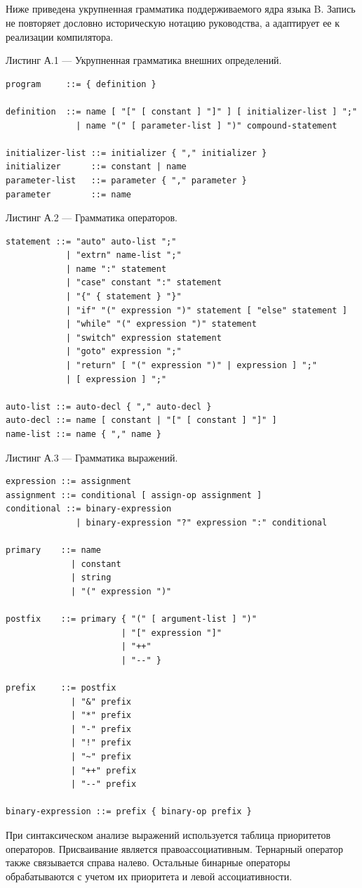 \begin{appendices}
\chapter{}

Ниже приведена укрупненная грамматика поддерживаемого ядра языка B. Запись не повторяет дословно историческую нотацию руководства, а адаптирует ее к реализации компилятора.

Листинг А.1 --- Укрупненная грамматика внешних определений.
\begin{verbatim}
program     ::= { definition }

definition  ::= name [ "[" [ constant ] "]" ] [ initializer-list ] ";"
              | name "(" [ parameter-list ] ")" compound-statement

initializer-list ::= initializer { "," initializer }
initializer      ::= constant | name
parameter-list   ::= parameter { "," parameter }
parameter        ::= name
\end{verbatim}

Листинг А.2 --- Грамматика операторов.
\begin{verbatim}
statement ::= "auto" auto-list ";"
            | "extrn" name-list ";"
            | name ":" statement
            | "case" constant ":" statement
            | "{" { statement } "}"
            | "if" "(" expression ")" statement [ "else" statement ]
            | "while" "(" expression ")" statement
            | "switch" expression statement
            | "goto" expression ";"
            | "return" [ "(" expression ")" | expression ] ";"
            | [ expression ] ";"

auto-list ::= auto-decl { "," auto-decl }
auto-decl ::= name [ constant | "[" [ constant ] "]" ]
name-list ::= name { "," name }
\end{verbatim}

Листинг А.3 --- Грамматика выражений.
\begin{verbatim}
expression ::= assignment
assignment ::= conditional [ assign-op assignment ]
conditional ::= binary-expression
              | binary-expression "?" expression ":" conditional

primary    ::= name
             | constant
             | string
             | "(" expression ")"

postfix    ::= primary { "(" [ argument-list ] ")"
                       | "[" expression "]"
                       | "++"
                       | "--" }

prefix     ::= postfix
             | "&" prefix
             | "*" prefix
             | "-" prefix
             | "!" prefix
             | "~" prefix
             | "++" prefix
             | "--" prefix

binary-expression ::= prefix { binary-op prefix }
\end{verbatim}

При синтаксическом анализе выражений используется таблица приоритетов операторов. Присваивание является правоассоциативным. Тернарный оператор также связывается справа налево. Остальные бинарные операторы обрабатываются с учетом их приоритета и левой ассоциативности.
\end{appendices}
